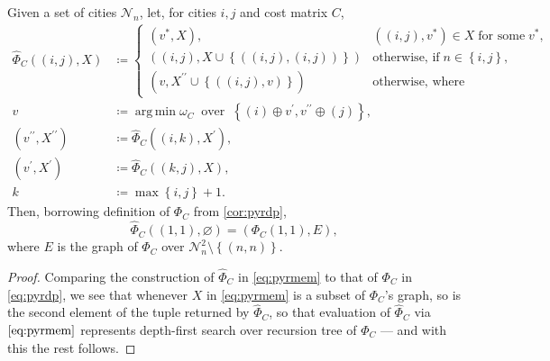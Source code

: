 \documentclass[index=totoc,bibliography=totoc]{scrartcl}
\newcommand{\annotation}[1]{\marginpar{\small\itshape\color{green}#1}}
\DeclareMathOperator*{\argmin}{arg\,min}
\numberwithin{equation}{section}
\numberwithin{figure}{section}
\numberwithin{table}{section}
\begin{document}
\begin{proposition}
\label{prop:pyrmem}
\annotation{layout!}
  Given a set of cities $\mathcal{N}_n$, let, for cities $i,j$ and cost matrix $C$,
  \begin{align}
    \label{eq:pyrmem}
    \widehat{\Phi}_C\left((i,j),X\right) & \coloneqq
    \begin{cases}
      \left(v^\ast,X\right), & \left((i,j),v^\ast\right) \in X \;\text{for some}\; v^\ast,
      \\
      \left((i,j),X \cup \left\{\left((i,j),(i,j)\right)\right\}\right) & \text{otherwise, if}\; n \in \left\{i,j\right\},
      \\
      \left(v,X^{\prime\prime} \cup \left\{\left((i,j),v\right)\right\}\right) & \text{otherwise, where}
    \end{cases}
    \\
    v & \coloneqq \argmin \omega_C
    \;\;\text{over}\;\; {\left\{(i) \oplus v^\prime, v^{\prime\prime} \oplus (j) \right\}},
    \nonumber
    \\
    \left(v^{\prime\prime},X^{\prime\prime}\right) & \coloneqq \widehat{\Phi}_C\left((i,k),X^\prime\right),
    \nonumber
    \\
    \left(v^{\prime},X^{\prime}\right) & \coloneqq \widehat{\Phi}_C\left((k,j),X\right),
    \nonumber
    \\
    k & \coloneqq \max \left\{i,j\right\} + 1.
    \nonumber
  \end{align}
  Then, borrowing definition of $\Phi_C$ from \cref{cor:pyrdp},
  \[
    \widehat{\Phi}_C\left((1,1),\varnothing\right) = \left(\Phi_C\left(1,1\right),E\right),
  \]
  where $E$ is the graph of $\Phi_C$ over $\mathcal{N}_n^2 \setminus \left\{(n,n)\right\}$.
\end{proposition}
\begin{proof}
  Comparing the construction of $\widehat{\Phi}_C$ in \cref{eq:pyrmem} to
  that of $\Phi_C$ in \cref{eq:pyrdp}, we see that whenever $X$ in
  \eqref{eq:pyrmem} is a subset of $\Phi_C$'s graph, so is the second
  element of the tuple returned by $\widehat{\Phi}_C$, so that evaluation of
  $\widehat{\Phi}_C$ via $\eqref{eq:pyrmem}$ represents depth-first
  search over recursion tree of $\Phi_C$ --- and with this the rest
  follows.
\end{proof}
\end{document}
